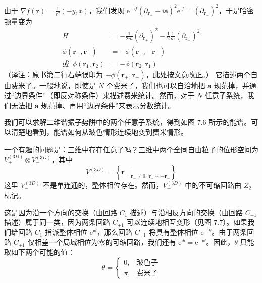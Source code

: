 
由于 $\nabla f(\pmb{r}) = \frac{1}{r^2}(-y, x)$，我们发现 $\mathrm{e}^{-\mathrm{i}f}(\partial_{\pmb{r}_-}-\mathrm{i}\pmb{a})^2\mathrm{e}^{\mathrm{i}f} = (\partial_{\pmb{r}_-})^2$，于是哈密顿量变为
\begin{equation*}
\begin{aligned}
H &= -\frac{1}{2m}(\partial_{\pmb{r}_+})^2 - \frac{1}{2}\frac{1}{m}(\partial_{\pmb{r}_-})^2\\
\phi(\pmb{r}_+,\pmb{r}_-) &= -\phi(\pmb{r}_+,-\pmb{r}_-)\\
\text{或}\ \ \phi(\pmb{r}_1,\pmb{r}_2) &= -\phi(\pmb{r}_2,\pmb{r}_1)
\end{aligned}
\end{equation*}
（译注：原书第二行右端误印为 $-\phi(\pmb{r}_+,\pmb{r}_-)$，此处按文意改正。）
它描述两个自由费米子。一般地说，即使是 $N$ 个费米子，我们也可以自洽地把 $\pmb{a}$ 规范掉，并通过“边界条件”（即反对称条件）来描述费米统计。然而，对于 $N$ 任意子系统，我们无法把 $\pmb{a}$ 规范掉、再用“边界条件”来表示分数统计。

我们可以求解二维谐振子势阱中的两个任意子系统，得到如图 7.6 所示的能谱。可以清楚地看到，能谱如何从玻色情形连续地变到费米情形。

一个有趣的问题是：三维中存在任意子吗？三维中两个全同自由粒子的位形空间为 $V_+^{(3D)}\otimes V_-^{(3D)}$，其中
\begin{equation*}
V_-^{(3D)} = \left\{\pmb{r}_-\big|_{\pmb{r}_-\neq 0,\ \pmb{r}_-\sim-\pmb{r}_-}\right\}
\end{equation*}
这里 $V_-^{(3D)}$ 不是单连通的，整体相位存在。然而，$V_-^{(3D)}$ 中的不可缩回路由 $Z_2$ 标记。



这是因为沿一个方向的交换（由回路 $C_1$ 描述）与沿相反方向的交换（由回路 $C_{-1}$ 描述）属于同一类，因为两条回路 $C_{\pm 1}$ 可以连续地相互变形（见图 7.7）。如果我们给回路 $C_1$ 指派整体相位 $\mathrm{e}^{\mathrm{i}\theta}$，那么回路 $C_{-1}$ 将具有整体相位 $\mathrm{e}^{-\mathrm{i}\theta}$。由于两条回路 $C_{\pm 1}$ 仅相差一个局域相位为零的可缩回路，我们还有 $\mathrm{e}^{\mathrm{i}\theta}=\mathrm{e}^{-\mathrm{i}\theta}$。因此，$\theta$ 只能取如下两个可能的值：
\begin{equation*}
\theta = \left\{\begin{array}{cl}
0, & \text{玻色子}\\
\pi, & \text{费米子}
\end{array}\right.
\end{equation*}

